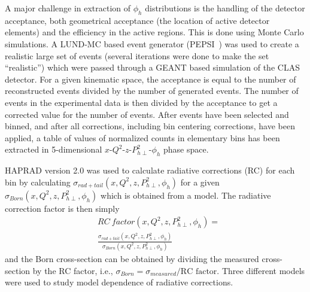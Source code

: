 \documentclass[aps,prl,twocolumn,showpacs,superscriptaddress,groupedaddress]{revtex4-1}  %
\newcommand{\Phperp}{P_{h\perp}}
\begin{document}
A major challenge in extraction of $\phi_h$ distributions is the handling of the detector acceptance, both geometrical acceptance (the location of active detector elements) and the efficiency in the active regions.
This is done using Monte Carlo simulations.
A LUND-MC based event generator (PEPSI~\cite{Mankiewicz:1991dp}) was used to create a realistic large set of events (several iterations were done to make the set ``realistic'') which were passed through a GEANT based simulation of the CLAS detector.
For a given kinematic space, the acceptance is equal to the number of reconstructed events divided by the number of generated events.
The number of events in the experimental data is then divided by the acceptance to get a corrected value for the number of events.
After events have been selected and binned, and after all corrections, including bin centering corrections,  have been applied, 
a table of values of normalized counts in elementary bins has been extracted in 5-dimensional $x$-$Q^2$-$z$-$\Phperp^2$-$\phi_h$ phase space.

HAPRAD version 2.0 \cite{Akushevich:1999hz,Akushevich:2007jc} was used to calculate radiative corrections (RC) for each bin by calculating $\sigma_{rad+tail} \left( x, Q^2, z, P_{h\perp}^2, \phi_h \right)$ for a given \allowbreak $\sigma_{Born} \left( x, Q^2, z, P_{h\perp}^2, \phi_h \right)$ which is obtained from a model.
The radiative correction factor is then simply
\begin{equation}
\begin{split}
\label{eq:RCfactor}
& RC\ factor \left( x, Q^2, z, P_{h\perp}^2, \phi_h \right) =
\\
& \frac{\sigma_{rad+tail} \left( x, Q^2, z, P_{h\perp}^2, \phi_h \right)}{\sigma_{Born} \left( x, Q^2, z, P_{h\perp}^2, \phi_h \right)}
\end{split}
\end{equation}
and the Born cross-section can be obtained by dividing the measured cross-section by the RC factor, i.e., $\sigma_{Born} = \sigma_{measured}/\text{RC factor}$.
Three different models were used to study model dependence of radiative corrections.
\end{document}
